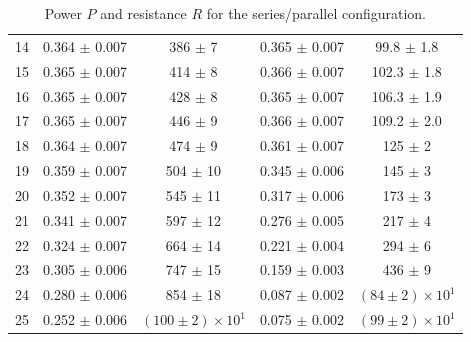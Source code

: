 \documentclass{article}
\begin{document}
{\begin{table}
\begin{tabular}{ccc||cc}
        14 & 0.364  $\pm$ 0.007           & 386                 $\pm$ 7   & 0.365  $\pm$ 0.007  & 99.8              $\pm$ 1.8 \\
        15 & 0.365  $\pm$ 0.007           & 414                 $\pm$ 8   & 0.366  $\pm$ 0.007  & 102.3             $\pm$ 1.8 \\
        16 & 0.365  $\pm$ 0.007           & 428                 $\pm$ 8   & 0.365  $\pm$ 0.007  & 106.3             $\pm$ 1.9 \\
        17 & 0.365  $\pm$ 0.007           & 446                 $\pm$ 9   & 0.366  $\pm$ 0.007  & 109.2             $\pm$ 2.0 \\
        18 & 0.364  $\pm$ 0.007           & 474                 $\pm$ 9   & 0.361  $\pm$ 0.007  & 125               $\pm$ 2   \\
        19 & 0.359  $\pm$ 0.007           & 504                 $\pm$ 10  & 0.345  $\pm$ 0.006  & 145               $\pm$ 3   \\
        20 & 0.352  $\pm$ 0.007           & 545                 $\pm$ 11  & 0.317  $\pm$ 0.006  & 173               $\pm$ 3   \\
        21 & 0.341  $\pm$ 0.007           & 597                 $\pm$ 12  & 0.276  $\pm$ 0.005  & 217               $\pm$ 4   \\
        22 & 0.324  $\pm$ 0.007           & 664                 $\pm$ 14  & 0.221  $\pm$ 0.004  & 294               $\pm$ 6   \\
        23 & 0.305  $\pm$ 0.006           & 747                 $\pm$ 15  & 0.159  $\pm$ 0.003  & 436               $\pm$ 9   \\
        24 & 0.280  $\pm$ 0.006           & 854                 $\pm$ 18  & 0.087  $\pm$ 0.002  & $(84\pm 2)\times 10^{1}$    \\
        25 & 0.252  $\pm$ 0.006           & $(100\pm 2)\times 10^{1}$     & 0.075  $\pm$ 0.002  & $(99\pm 2)\times 10^{1}$    \\
        \bottomrule
    \end{tabular}
    \caption{Power $P$ and resistance $R$ for the series/parallel configuration.}
    \label{tab:PRsingle}
\end{table}

}
\end{document}
